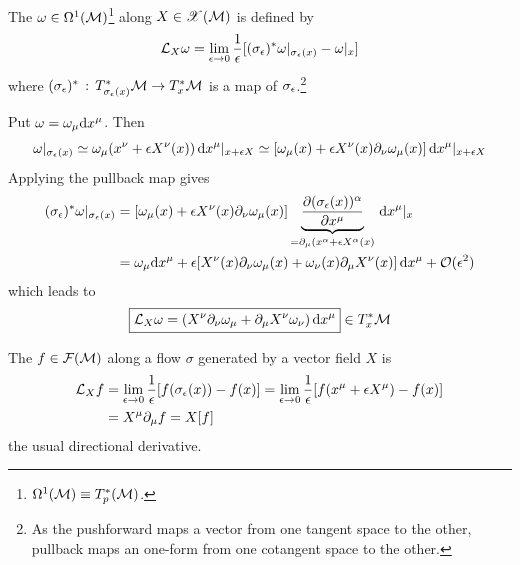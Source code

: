 \documentclass[a4paper, 10pt]{article}
\begin{document}

\begin{definition}
    The  $\omega \in \Omega^{1}(\mathcal{M})$\footnote{$\Omega^{1}(\mathcal{M}) \equiv T_{p}^{\ast}(\mathcal{M})$.} along $X \in \mathscr{X}(\mathcal{M})$ is defined by
    \[ \mathcal{L}_{X}\omega = \lim_{\epsilon\rightarrow 0}\frac{1}{\epsilon}[(\sigma_{\epsilon})^{\ast}\omega|_{\sigma_{\epsilon}(x)} - \omega|_{x}] \]
    where $(\sigma_{\epsilon})^{\ast}\,:\,T_{\sigma_{\epsilon}(x)}^{\ast}\mathcal{M} \rightarrow T_{x}^{\ast}\mathcal{M}$ is a  map of $\sigma_{\epsilon}$.\footnote{As the pushforward maps a vector from one tangent space to the other, pullback maps an one-form from one cotangent space to the other.}
\end{definition}

\begin{obs}
    Put $\omega = \omega_{\mu}\mathrm{d}{x}^{\mu}$. Then
    \[ \omega|_{\sigma_{\epsilon}(x)} \simeq \omega_{\mu}(x^{\nu} + \epsilon X^{\nu}(x))\,\mathrm{d}{x}^{\mu}|_{x+\epsilon X} \simeq [\omega_{\mu}(x) + \epsilon X^{\nu}(x)\partial_{\nu}\omega_{\mu}(x)]\,\mathrm{d}{x}^{\mu}|_{x + \epsilon X} \]
    Applying the pullback map gives
    \begin{align*}
        (\sigma_{\epsilon})^{\ast}\omega|_{\sigma_{\epsilon}(x)} &= [\omega_{\mu}(x) + \epsilon X^{\nu}(x)\partial_{\nu}\omega_{\mu}(x)] \underbrace{\frac{\partial(\sigma_{\epsilon}(x))^{\alpha}}{\partial x^{\mu}}}_{=\partial_{\mu}(x^{\alpha} + \epsilon X^{\alpha}(x)}\,\mathrm{d}{x}^{\mu}|_{x} \\
        &= \omega_{\mu}\mathrm{d}{x}^{\mu} + \epsilon[X^{\nu}(x)\partial_{\nu}\omega_{\mu}(x) + \omega_{\nu}(x)\partial_{\mu}X^{\nu}(x)]\,\mathrm{d}{x}^{\mu} + \mathcal{O}(\epsilon^{2})
    \end{align*}
    which leads to
    \[ \boxed{\mathcal{L}_{X}\omega = (X^{\nu}\partial_{\nu}\omega_{\mu} + \partial_{\mu}X^{\nu}\omega_{\nu})\,\mathrm{d}{x}^{\mu}} \in T_{x}^{\ast}\mathcal{M} \]
\end{obs}

\begin{obs}
    The  $f \in \mathcal{F}(\mathcal{M})$ along a flow $\sigma$ generated by a vector field $X$ is
    \begin{align*}
        \mathcal{L}_{X}f &= \lim_{\epsilon\rightarrow 0}\frac{1}{\epsilon}[f(\sigma_{\epsilon}(x)) - f(x)] = \lim_{\epsilon\rightarrow 0}\frac{1}{\epsilon}[f(x^{\mu} + \epsilon X^{\mu}) - f(x)] \\
        &= X^{\mu}\partial_{\mu}f = X[f]
    \end{align*}
    the usual directional derivative.
\end{obs}
\end{document}
